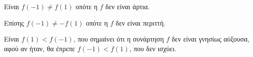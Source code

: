 \begin{alist}
\item Είναι $f(-1) \ne f(1)$ οπότε η $f$ δεν είναι άρτια.
\item Επίσης $f(-1) \ne -f(1)$ οπότε η $f$ δεν είναι περιττή.
\item Είναι $f(1) < f(-1)$, που σημαίνει ότι η συνάρτηση $f$ δεν είναι γνησίως αύξουσα, αφού αν ήταν, θα έπρεπε $f(-1) < f(1)$, που δεν ισχύει.
\end{alist}

